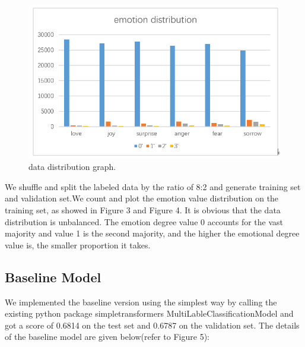 \documentclass[12pt,twocolumn,letterpaper]{article}
\begin{document}
\begin{figure}
\begin{center}
\includegraphics[scale=0.3]{emotion distribution.png}
\end{center}
   \caption{data distribution graph.}
\label{fig:short}
\end{figure}
We shuffle and split the labeled data  by the ratio of 8:2 and generate training set and validation set.We count and plot the emotion value distribution on the training set, as showed in Figure 3 and Figure 4. It is obvious that the data distribution is unbalanced. The emotion degree value 0 accounts for the vast majority and value 1 is the second majority, and the higher the emotional degree value is, the smaller proportion it takes. 



\subsection{Baseline Model}

We implemented the baseline version using the simplest way by calling the existing python package simpletransformers MultiLableClassificationModel and got a score of 0.6814 on the test set and 0.6787 on the validation set. The details of the baseline model are given below(refer to Figure 5):
\end{document}

